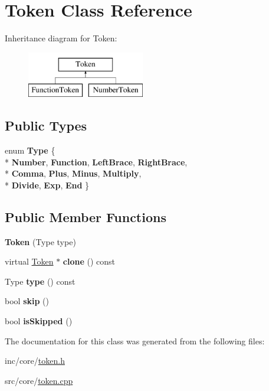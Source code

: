 \hypertarget{classToken}{\section{Token Class Reference}
\label{classToken}
}
Inheritance diagram for Token\-:\begin{figure}[H]
\begin{center}
\leavevmode
\includegraphics[height=2.000000cm]{classToken}
\end{center}
\end{figure}
\subsection*{Public Types}
\begin{DoxyCompactItemize}
\item 
enum {\bfseries Type} \{ \\*
{\bfseries Number}, 
{\bfseries Function}, 
{\bfseries Left\-Brace}, 
{\bfseries Right\-Brace}, 
\\*
{\bfseries Comma}, 
{\bfseries Plus}, 
{\bfseries Minus}, 
{\bfseries Multiply}, 
\\*
{\bfseries Divide}, 
{\bfseries Exp}, 
{\bfseries End}
 \}
\end{DoxyCompactItemize}
\subsection*{Public Member Functions}
\begin{DoxyCompactItemize}
\item 
\hypertarget{classToken_ac5b1af731830b70f07e948c466becf5e}{{\bfseries Token} (Type type)}\label{classToken_ac5b1af731830b70f07e948c466becf5e}

\item 
\hypertarget{classToken_a3ae2969e35156789ddd09ee0843caca1}{virtual \hyperlink{classToken}{Token} $\ast$ {\bfseries clone} () const }\label{classToken_a3ae2969e35156789ddd09ee0843caca1}

\item 
\hypertarget{classToken_a3fea7300d8391a3da7a3a5bc63969d0d}{Type {\bfseries type} () const }\label{classToken_a3fea7300d8391a3da7a3a5bc63969d0d}

\item 
\hypertarget{classToken_a97ed582c3ba469e23266a1d8fb7229ee}{bool {\bfseries skip} ()}\label{classToken_a97ed582c3ba469e23266a1d8fb7229ee}

\item 
\hypertarget{classToken_a7017ff7cd24c4cd05af0cb654ecde369}{bool {\bfseries is\-Skipped} ()}\label{classToken_a7017ff7cd24c4cd05af0cb654ecde369}

\end{DoxyCompactItemize}


The documentation for this class was generated from the following files\-:\begin{DoxyCompactItemize}
\item 
inc/core/\hyperlink{token_8h}{token.\-h}\item 
src/core/\hyperlink{token_8cpp}{token.\-cpp}\end{DoxyCompactItemize}
